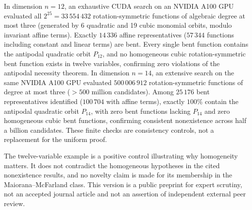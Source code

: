\documentclass[11pt,a4paper]{article}
\theoremstyle{remark}
\theoremstyle{plain}
\begin{document}
In dimension $n=12$, an exhaustive CUDA search on an NVIDIA A100 GPU evaluated all $2^{25} = 33\,554\,432$ rotation-symmetric functions of algebraic degree at most three (generated by 6 quadratic and 19 cubic monomial orbits, modulo invariant affine terms). Exactly $14\,336$ affine representatives ($57\,344$ functions including constant and linear terms) are bent. Every single bent function contains the antipodal quadratic orbit $P_{12}$, and no homogeneous cubic rotation-symmetric bent function exists in twelve variables, confirming zero violations of the antipodal necessity theorem. In dimension $n=14$, an extensive search on the same NVIDIA A100 GPU evaluated $500\,006\,912$ rotation-symmetric functions of degree at most three ($>500$ million candidates). Among $25\,176$ bent representatives identified ($100\,704$ with affine terms), exactly $100\%$ contain the antipodal quadratic orbit $P_{14}$, with zero bent functions lacking $P_{14}$ and zero homogeneous cubic bent functions, confirming consistent nonexistence across half a billion candidates. These finite checks are consistency controls, not a replacement for the uniform proof.

The twelve-variable example is a positive control illustrating why homogeneity matters. It does not contradict the homogeneous hypotheses in the cited nonexistence results, and no novelty claim is made for its membership in the Maiorana--McFarland class. This version is a public preprint for expert scrutiny, not an accepted journal article and not an assertion of independent external peer review.
\end{document}
